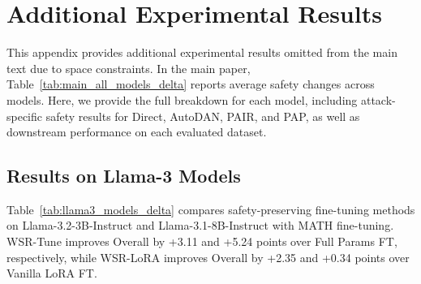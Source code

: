 \documentclass{article}
\newcommand{\wjb}[1]{{\leavevmode\color{orange}[jb: #1]}}
\begin{document}
\newpage

\section{Additional Experimental Results}
\label{app:additional_results}


This appendix provides additional experimental results omitted from the main text due to space constraints. 
In the main paper, Table~\ref{tab:main_all_models_delta} reports average safety changes across models. 
Here, we provide the full breakdown for each model, including attack-specific safety results for Direct, AutoDAN, PAIR, and PAP, as well as downstream performance on each evaluated dataset.



\subsection{Results on Llama-3 Models}
\label{app:llama3_results}

Table~\ref{tab:llama3_models_delta} compares safety-preserving fine-tuning methods on Llama-3.2-3B-Instruct and Llama-3.1-8B-Instruct with MATH fine-tuning. WSR-Tune improves Overall by +3.11 and +5.24 points over Full Params FT, respectively, while WSR-LoRA improves Overall by +2.35 and +0.34 points over Vanilla LoRA FT.
\end{document}
